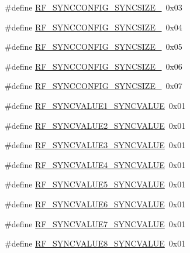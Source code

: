 \begin{DoxyCompactItemize}
\item 
\#define \hyperlink{sx1276Regs-Fsk_8h_a3e690add68a9524bb58f47842e68d83c}{R\+F\+\_\+\+S\+Y\+N\+C\+C\+O\+N\+F\+I\+G\+\_\+\+S\+Y\+N\+C\+S\+I\+Z\+E\+\_}~0x03
\item 
\#define \hyperlink{sx1276Regs-Fsk_8h_a604cc721857bae9b870b53048ecf341b}{R\+F\+\_\+\+S\+Y\+N\+C\+C\+O\+N\+F\+I\+G\+\_\+\+S\+Y\+N\+C\+S\+I\+Z\+E\+\_}~0x04
\item 
\#define \hyperlink{sx1276Regs-Fsk_8h_aff9f3662ee515712447db47565a8f7dc}{R\+F\+\_\+\+S\+Y\+N\+C\+C\+O\+N\+F\+I\+G\+\_\+\+S\+Y\+N\+C\+S\+I\+Z\+E\+\_}~0x05
\item 
\#define \hyperlink{sx1276Regs-Fsk_8h_a9d9db7e70160e306d46e9a3fb119497d}{R\+F\+\_\+\+S\+Y\+N\+C\+C\+O\+N\+F\+I\+G\+\_\+\+S\+Y\+N\+C\+S\+I\+Z\+E\+\_}~0x06
\item 
\#define \hyperlink{sx1276Regs-Fsk_8h_a3ad4c813c0827a01d61620f16a8e6867}{R\+F\+\_\+\+S\+Y\+N\+C\+C\+O\+N\+F\+I\+G\+\_\+\+S\+Y\+N\+C\+S\+I\+Z\+E\+\_}~0x07
\item 
\#define \hyperlink{sx1276Regs-Fsk_8h_a9dbf8a5e894ab724bb15b1721e218127}{R\+F\+\_\+\+S\+Y\+N\+C\+V\+A\+L\+U\+E1\+\_\+\+S\+Y\+N\+C\+V\+A\+L\+UE}~0x01
\item 
\#define \hyperlink{sx1276Regs-Fsk_8h_ab6518f99eb4a677a3fe535db8d48c732}{R\+F\+\_\+\+S\+Y\+N\+C\+V\+A\+L\+U\+E2\+\_\+\+S\+Y\+N\+C\+V\+A\+L\+UE}~0x01
\item 
\#define \hyperlink{sx1276Regs-Fsk_8h_aced5402e8dbb4d7795d00b115981f2f4}{R\+F\+\_\+\+S\+Y\+N\+C\+V\+A\+L\+U\+E3\+\_\+\+S\+Y\+N\+C\+V\+A\+L\+UE}~0x01
\item 
\#define \hyperlink{sx1276Regs-Fsk_8h_adf2d6af9d59e50370870d65071817b10}{R\+F\+\_\+\+S\+Y\+N\+C\+V\+A\+L\+U\+E4\+\_\+\+S\+Y\+N\+C\+V\+A\+L\+UE}~0x01
\item 
\#define \hyperlink{sx1276Regs-Fsk_8h_ae874599f8f93c33fc5c2bdc53602ebe5}{R\+F\+\_\+\+S\+Y\+N\+C\+V\+A\+L\+U\+E5\+\_\+\+S\+Y\+N\+C\+V\+A\+L\+UE}~0x01
\item 
\#define \hyperlink{sx1276Regs-Fsk_8h_ab94bee7a110ee04831e6a396a3d2a890}{R\+F\+\_\+\+S\+Y\+N\+C\+V\+A\+L\+U\+E6\+\_\+\+S\+Y\+N\+C\+V\+A\+L\+UE}~0x01
\item 
\#define \hyperlink{sx1276Regs-Fsk_8h_a98fd9daba44f509a22b528f6ce39a8ca}{R\+F\+\_\+\+S\+Y\+N\+C\+V\+A\+L\+U\+E7\+\_\+\+S\+Y\+N\+C\+V\+A\+L\+UE}~0x01
\item 
\#define \hyperlink{sx1276Regs-Fsk_8h_aed618a9d802603a9727223a9b66fa39e}{R\+F\+\_\+\+S\+Y\+N\+C\+V\+A\+L\+U\+E8\+\_\+\+S\+Y\+N\+C\+V\+A\+L\+UE}~0x01
\item 

\end{DoxyCompactItemize}
